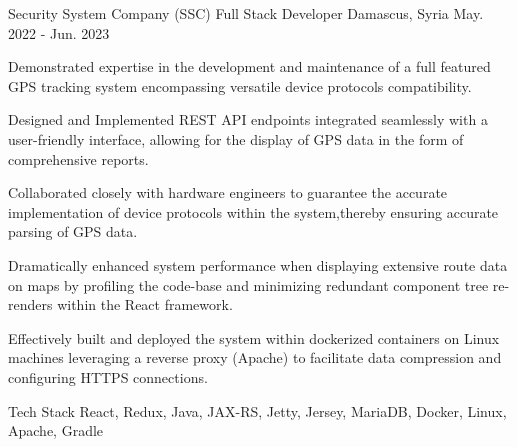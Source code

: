 

\begin{cventries}

  \cventry
    {Security System Company (SSC)}  %
    {Full Stack Developer} %
    {Damascus, Syria} %
    {May. 2022 - Jun. 2023} %
    {
      \begin{cvitems} %
        \item {Demonstrated expertise in the development and maintenance of a full featured GPS tracking system encompassing versatile 
        device protocols compatibility.}
        \item {Designed and Implemented REST API endpoints integrated seamlessly with a user-friendly interface, allowing for the display of GPS data in the form of comprehensive reports.}
        \item {Collaborated closely with hardware engineers to guarantee the accurate implementation of device protocols within the system,thereby ensuring accurate parsing of GPS data.}
        \item {Dramatically enhanced system performance when displaying extensive route data on maps by profiling the code-base and minimizing redundant component tree re-renders within the React framework.}
        \item {Effectively built and deployed the system within dockerized containers on Linux machines leveraging a reverse proxy (Apache) to facilitate data compression and configuring HTTPS connections.}
      \end{cvitems}
    }
    \begin{cventrytechstack}
        \cvtechstack
        {Tech Stack} %
        {React,  Redux,  Java,  JAX-RS,  Jetty,  Jersey,  MariaDB,   Docker,  Linux, Apache, Gradle} %
    \end{cventrytechstack}


\end{cventries}
